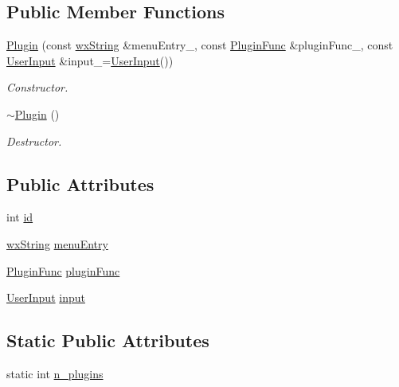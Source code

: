 \subsection*{Public Member Functions}
\begin{DoxyCompactItemize}
\item 
\hyperlink{structstf_1_1Plugin_a0609473477d0237371571bfe143536bf}{Plugin} (const \hyperlink{classwxString}{wxString} \&menuEntry\_\-, const \hyperlink{group__stfgen_gaa37601710b061d50b53ceeab1e7a9dd2}{PluginFunc} \&pluginFunc\_\-, const \hyperlink{structstf_1_1UserInput}{UserInput} \&input\_\-=\hyperlink{structstf_1_1UserInput}{UserInput}())
\begin{DoxyCompactList}\small\item\em Constructor. \item\end{DoxyCompactList}\item 
\hypertarget{structstf_1_1Plugin_a2347a780c8b165fd604f8bd5656630a5}{
\hyperlink{structstf_1_1Plugin_a2347a780c8b165fd604f8bd5656630a5}{$\sim$Plugin} ()}
\label{structstf_1_1Plugin_a2347a780c8b165fd604f8bd5656630a5}

\begin{DoxyCompactList}\small\item\em Destructor. \item\end{DoxyCompactList}\end{DoxyCompactItemize}
\subsection*{Public Attributes}
\begin{DoxyCompactItemize}
\item 
int \hyperlink{structstf_1_1Plugin_a417ea89eae1a8fbd21e7c7488d14fd7d}{id}
\item 
\hyperlink{classwxString}{wxString} \hyperlink{structstf_1_1Plugin_a9e7060c1a895ba6ea04250c2c1313272}{menuEntry}
\item 
\hyperlink{group__stfgen_gaa37601710b061d50b53ceeab1e7a9dd2}{PluginFunc} \hyperlink{structstf_1_1Plugin_aebef99c1f1bd1d6c69ff8fb31988d22d}{pluginFunc}
\item 
\hyperlink{structstf_1_1UserInput}{UserInput} \hyperlink{structstf_1_1Plugin_a53713a074aabf4d0e873d9d13b1e60f3}{input}
\end{DoxyCompactItemize}
\subsection*{Static Public Attributes}
\begin{DoxyCompactItemize}
\item 
static int \hyperlink{structstf_1_1Plugin_a41eba3414a715e63c4dfff9fc2d53851}{n\_\-plugins}
\end{DoxyCompactItemize}


